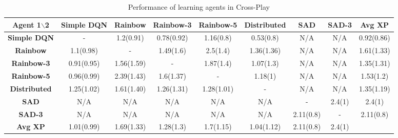 \begin{table*}
    \caption{Performance of learning agents in Cross-Play}
    \label{tab:xp_performance}
    \begin{tabular}{|c|c|c|c|c|c|c|c|c|}
      \toprule
        \textbf{Agent 1$\backslash$2}   &
        \textbf{Simple DQN}  &
        \textbf{Rainbow}     &
        \textbf{Rainbow-3}   &
        \textbf{Rainbow-5}   &
        \textbf{Distributed} &
        \textbf{SAD}         &
        \textbf{SAD-3}       &
        \textbf{Avg XP} \\
      \midrule
      \textbf{Simple DQN} &
        - &
        1.2(0.91) &
        0.78(0.92) &
        1.16(0.8) &
        0.53(0.8) &
        N/A &
        N/A &
        0.92(0.86) \\
      
        \textbf{Rainbow} &
        1.1(0.98) &
        - &
        1.49(1.6) &
        2.5(1.4) &
        1.36(1.36) &
        N/A &
        N/A &
        1.61(1.33) \\

        \textbf{Rainbow-3} &
        0.91(0.95) &
        1.56(1.59) &
        - &
        1.87(1.4) &
        1.07(1.3) &
        N/A &
        N/A &
        1.35(1.31) \\

        \textbf{Rainbow-5} &
        0.96(0.99) &
        2.39(1.43) &
        1.6(1.37) &
        - &
        1.18(1) &
        N/A &
        N/A &
        1.53(1.2) \\

        \textbf{Distributed} &
        1.25(1.02) &
        1.61(1.40) &
        1.26(1.31) &
        1.28(1.01) &
        - &
        N/A &
        N/A &
        1.35(1.19) \\

        \textbf{SAD} &
        N/A                  &
                N/A                  &
                N/A                  &
                N/A                  &
                N/A                  &
                -                    &
                2.4(1)               &
                2.4(1)
                \\ 



        \textbf{SAD-3}       &
        N/A                  &
        N/A                  &
        N/A                  &
        N/A                  &
        N/A                  &
        2.11(0.8)            &
        -                    &
        2.11(0.8)
        \\ 

        \textbf{Avg XP}      &
        1.01(0.99)           &
        1.69(1.33)           &
        1.28(1.3)            &
        1.7(1.15)            &
        1.04(1.12)           &
        2.11(0.8)            &
        2.4(1)               &
        \\ 
    \bottomrule
  \end{tabular}
  \end{table*}